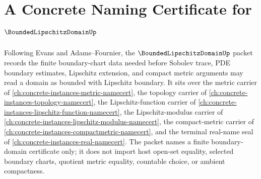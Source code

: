\chapter{A Concrete Naming Certificate for $\BoundedLipschitzDomainUp$}
\label{ch:concrete-instances-bounded-lipschitz-domain-namecert}

Following Evans and Adams--Fournier, the $\BoundedLipschitzDomainUp$ packet records the finite boundary-chart data needed before Sobolev trace, PDE boundary estimates, Lipschitz extension, and compact metric arguments may read a domain as bounded with Lipschitz boundary. It sits over the metric carrier of \autoref{ch:concrete-instances-metric-namecert}, the topology carrier of \autoref{ch:concrete-instances-topology-namecert}, the Lipschitz-function carrier of \autoref{ch:concrete-instances-lipschitz-function-namecert}, the Lipschitz-modulus carrier of \autoref{ch:concrete-instances-lipschitz-modulus-namecert}, the compact-metric carrier of \autoref{ch:concrete-instances-compactmetric-namecert}, and the terminal real-name seal of \autoref{ch:concrete-instances-real-namecert}. The packet names a finite boundary-domain certificate only; it does not import host open-set equality, selected boundary charts, quotient metric equality, countable choice, or ambient compactness.

